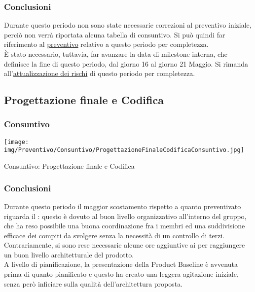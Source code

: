 \subsubsection{Conclusioni}
Durante questo periodo non sono state necessarie correzioni al preventivo iniziale, perciò non verrà riportata alcuna tabella di consuntivo. Si può quindi far riferimento al \hyperref[PreventivoAnalisiRequisitiDettaglio]{preventivo} relativo a questo periodo per completezza. \\
È stato necessario, tuttavia, far avanzare la data di milestone interna, che definisce la fine di questo periodo, dal giorno 16 al giorno 21 Maggio. Si rimanda all'\hyperref[RiscontroPrototipazioneDettaglio]{attualizzazione dei rischi} di questo periodo per completezza.

\subsection{Progettazione finale e Codifica} \label{ConsuntivoPeriodoProgettazione}
\subsubsection{Consuntivo}
\begin{table}[h!]
	\centerline{\texttt{[image: img/Preventivo/Consuntivo/ProgettazioneFinaleCodificaConsuntivo.jpg]}}
	\caption{Consuntivo: Progettazione finale e Codifica}
\end{table}
\subsubsection{Conclusioni}
Durante questo periodo il maggior scostamento rispetto a quanto preventivato riguarda il \RdP: questo è dovuto al buon livello organizzativo all'interno del gruppo, che ha reso possibile una buona coordinazione fra i membri ed una suddivisione efficace dei compiti da svolgere senza la necessità di un controllo di terzi. Contrariamente, si sono rese necessarie alcune ore aggiuntive ai \progs per raggiungere un buon livello architetturale del prodotto. \\ 
A livello di pianificazione, la presentazione della Product Baseline è avvenuta prima di quanto pianificato e questo ha creato una leggera agitazione iniziale, senza però inficiare sulla qualità dell'architettura proposta.
